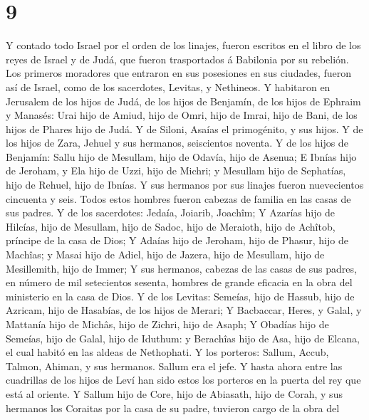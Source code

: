 \hypertarget{section-8}{%
\section{9}\label{section-8}}

 Y contado todo Israel por el orden de los linajes, fueron
escritos en el libro de los reyes de Israel y de Judá, que fueron
trasportados á Babilonia por su rebelión.  Los primeros
moradores que entraron en sus posesiones en sus ciudades, fueron así de
Israel, como de los sacerdotes, Levitas, y Nethineos.  Y
habitaron en Jerusalem de los hijos de Judá, de los hijos de Benjamín,
de los hijos de Ephraim y Manasés:  Urai hijo de Amiud, hijo
de Omri, hijo de Imrai, hijo de Bani, de los hijos de Phares hijo de
Judá.  Y de Siloni, Asaías el primogénito, y sus hijos.
 Y de los hijos de Zara, Jehuel y sus hermanos, seiscientos
noventa.  Y de los hijos de Benjamín: Sallu hijo de
Mesullam, hijo de Odavía, hijo de Asenua;  E Ibnías hijo de
Jeroham, y Ela hijo de Uzzi, hijo de Michri; y Mesullam hijo de
Sephatías, hijo de Rehuel, hijo de Ibnías.  Y sus hermanos
por sus linajes fueron nuevecientos cincuenta y seis. Todos estos
hombres fueron cabezas de familia en las casas de sus padres.
 Y de los sacerdotes: Jedaía, Joiarib, Joachîm;
 Y Azarías hijo de Hilcías, hijo de Mesullam, hijo de
Sadoc, hijo de Meraioth, hijo de Achîtob, príncipe de la casa de Dios;
 Y Adaías hijo de Jeroham, hijo de Phasur, hijo de Machîas;
y Masai hijo de Adiel, hijo de Jazera, hijo de Mesullam, hijo de
Mesillemith, hijo de Immer;  Y sus hermanos, cabezas de las
casas de sus padres, en número de mil setecientos sesenta, hombres de
grande eficacia en la obra del ministerio en la casa de Dios.
 Y de los Levitas: Semeías, hijo de Hassub, hijo de
Azricam, hijo de Hasabías, de los hijos de Merari;  Y
Bacbaccar, Heres, y Galal, y Mattanía hijo de Michâs, hijo de Zichri,
hijo de Asaph;  Y Obadías hijo de Semeías, hijo de Galal,
hijo de Iduthum: y Berachîas hijo de Asa, hijo de Elcana, el cual habitó
en las aldeas de Nethophati.  Y los porteros: Sallum,
Accub, Talmon, Ahiman, y sus hermanos. Sallum era el jefe. 
Y hasta ahora entre las cuadrillas de los hijos de Leví han sido estos
los porteros en la puerta del rey que está al oriente.  Y
Sallum hijo de Core, hijo de Abiasath, hijo de Corah, y sus hermanos los
Coraitas por la casa de su padre, tuvieron cargo de la obra del
